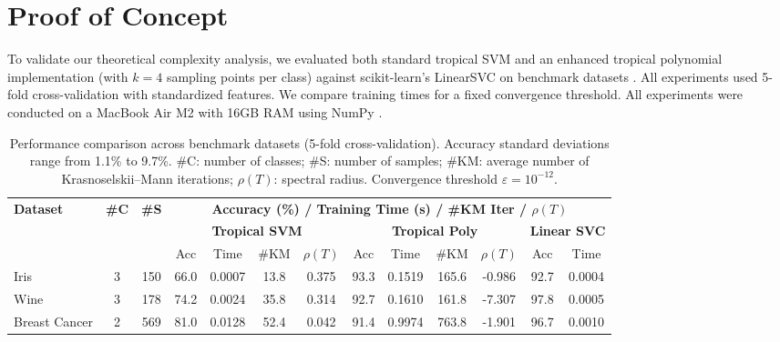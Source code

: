 \documentclass{article}
\begin{document}
\section{Proof of Concept}\label{appendix:empirical}

To validate our theoretical complexity analysis, we evaluated both standard tropical SVM and an enhanced tropical polynomial implementation (with $k=4$ sampling points per class) against scikit-learn's LinearSVC on benchmark datasets \cite{scikit-learn}. All experiments used 5-fold cross-validation with standardized features. We compare training times for a fixed convergence threshold. All experiments were conducted on a MacBook Air M2 with 16GB RAM using NumPy \cite{harris2020array}.

\begin{table}[h]
    \centering
    \footnotesize
    \begin{tabular}{@{}l@{\hskip 4pt}c@{\hskip 4pt}c@{\hskip 8pt}ccc@{\hskip 4pt}c@{\hskip 8pt}cccc@{\hskip 8pt}cc@{}}
    \toprule
    \multirow{3}{*}{\textbf{Dataset}} & \multirow{3}{*}{\textbf{\#C}} & \multirow{3}{*}{\textbf{\#S}} & \multicolumn{10}{c}{\textbf{Accuracy (\%) / Training Time (s) / \#KM Iter / $\rho(T)$}} \\
    \cmidrule(lr){4-13}
    & & & \multicolumn{4}{c}{\textbf{Tropical SVM}} & \multicolumn{4}{c}{\textbf{Tropical Poly}} & \multicolumn{2}{c}{\textbf{Linear SVC}} \\
    \cmidrule(lr){4-7} \cmidrule(lr){8-11} \cmidrule(lr){12-13}
    & & & Acc & Time & \#KM & $\rho(T)$ & Acc & Time & \#KM & $\rho(T)$ & Acc & Time \\
    \midrule
    Iris & 3 & 150 & 66.0 & 0.0007 & 13.8 & 0.375 & 93.3 & 0.1519 & 165.6 & -0.986 & 92.7 & 0.0004 \\
    Wine & 3 & 178 & 74.2 & 0.0024 & 35.8 & 0.314 & 92.7 & 0.1610 & 161.8 & -7.307 & 97.8 & 0.0005 \\
    Breast Cancer & 2 & 569 & 81.0 & 0.0128 & 52.4 & 0.042 & 91.4 & 0.9974 & 763.8 & -1.901 & 96.7 & 0.0010 \\
    \bottomrule
    \end{tabular}
    \vspace{0.5em}
    \caption{Performance comparison across benchmark datasets (5-fold cross-validation). Accuracy standard deviations range from 1.1\% to 9.7\%. \#C: number of classes; \#S: number of samples; \#KM: average number of Krasnoselskii--Mann iterations; $\rho(T)$: spectral radius. Convergence threshold $\varepsilon = 10^{-12}$.}
    \label{tab:benchmark_results}
\end{table}
\end{document}
